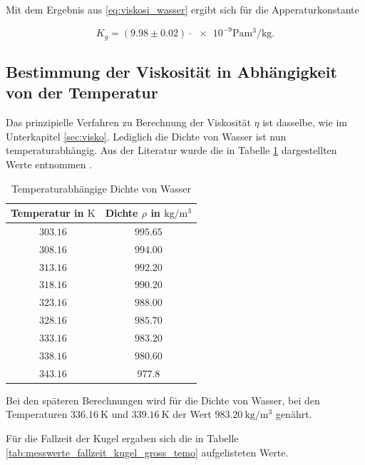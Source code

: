 Mit dem Ergebnis aus \eqref{eq:viskosi_wasser} ergibt sich für die 
Apperaturkonstante

\begin{equation}
\label{eq:app_konst_gross}
K_{g}=\left(\num{9.98}\pm\num{0.02}\right)\cdot{\num{e-9}} \si{\pascal\cubic\meter\per\kilogram}.
\end{equation}

\subsection{Bestimmung der Viskosität in Abhängigkeit von der Temperatur}

Das prinzipielle Verfahren zu Berechnung der Viskosität $\eta$ ist
dasselbe, wie im Unterkapitel \ref{sec:visko}. %
Lediglich die Dichte von Wasser ist nun temperaturabhängig.
Aus der Literatur wurde die in Tabelle \ref{tab:dichtewasser} dargestellten Werte
entnommen \cite{lit_dichte}.  %

\begin{table}
\centering
\begin{tabular} {cc}
  \toprule
  Temperatur in $\si{\kelvin}$ & Dichte $\rho$ in $\si{\kilogram\per\cubic\meter}$ \\
  \midrule
  $\num{303.16}$ &$\num{995.65}$ \\
  $\num{308.16}$ &$\num{994.00}$\\
  $\num{313.16}$ &$\num{992.20}$\\
  $\num{318.16}$ &$\num{990.20}$\\
  $\num{323.16}$ &$\num{988.00}$\\
  $\num{328.16}$ &$\num{985.70}$\\
  $\num{333.16}$ &$\num{983.20}$\\
  $\num{338.16}$ &$\num{980.60}$\\
  $\num{343.16}$ &$\num{977.8}$\\
\bottomrule
\end{tabular}
\caption{Temperaturabhängige Dichte von Wasser}
\label{tab:dichtewasser}
\end{table}

Bei den späteren Berechnungen wird für die Dichte von Wasser, bei den Temperaturen $\SI{336.16}{\kelvin}$ und $\SI{339.16}{\kelvin}$ 
der Wert $\SI{983.20}{\kilogram\per\cubic\meter}$ genährt.

Für die Fallzeit der Kugel ergaben sich die in 
Tabelle \ref{tab:messwerte_fallzeit_kugel_gross_temo} aufgelisteten Werte.

